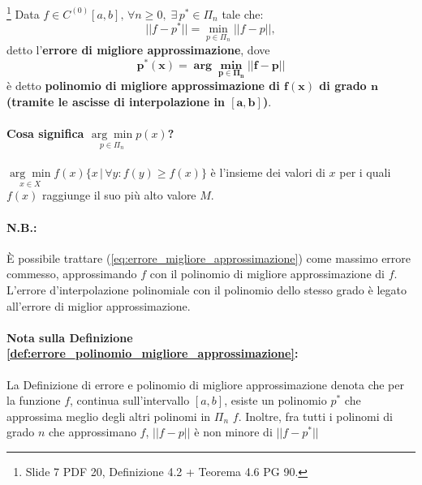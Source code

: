 \begin{definition}\label{def:errore_polinomio_migliore_approssimazione}\footnote{Slide 7 PDF 20, Definizione 4.2 + Teorema 4.6 PG 90.}
    Data $f\in C^{(0)}[a,b],\,\forall n\geq 0,\;\exists\, p^*\in\Pi_n$ tale che:
    \begin{equation}\label{eq:errore_migliore_approssimazione}
        ||f-p^*||=\underset{p\in\Pi_n}{\min}||f-p||,
    \end{equation}
    detto l'\textbf{errore di migliore approssimazione}, dove
    \begin{equation*}
    	\boldsymbol{p^*(x) = \arg\underset{p\in\Pi_n}{\min}||f-p||}
    \end{equation*}
    è detto \textbf{polinomio di migliore approssimazione di $\boldsymbol{f(x)}$ di grado $\boldsymbol n$ (tramite le ascisse di interpolazione in $\boldsymbol{[a,b]}$)}.
\end{definition}

\paragraph{Cosa significa $\underset{p\in \Pi_n}{\arg\min}p(x)$?} $\underset{x\in X}{\arg\min}f(x)\{x\,|\,\forall y : f(y)\geq f(x)\}$ è l'insieme dei valori di $x$ per i quali $f(x)$ raggiunge il suo più alto valore $M$.

\paragraph{N.B.:} È possibile trattare (\ref{eq:errore_migliore_approssimazione}) come massimo errore commesso, approssimando $f$ con il polinomio di migliore approssimazione di $f$. L'errore d'interpolazione polinomiale con il polinomio dello stesso grado è legato all'errore di miglior approssimazione.

\paragraph{Nota sulla Definizione \ref{def:errore_polinomio_migliore_approssimazione}:} La Definizione di errore e polinomio di migliore approssimazione denota che per la funzione $f$, continua sull'intervallo $[a,b]$, esiste un polinomio $p^*$ che approssima meglio degli altri polinomi in $\Pi_n$ $f$. Inoltre, fra tutti i polinomi di grado $n$ che approssimano $f$, $||f-p||$ è non minore di $||f-p^*||$



